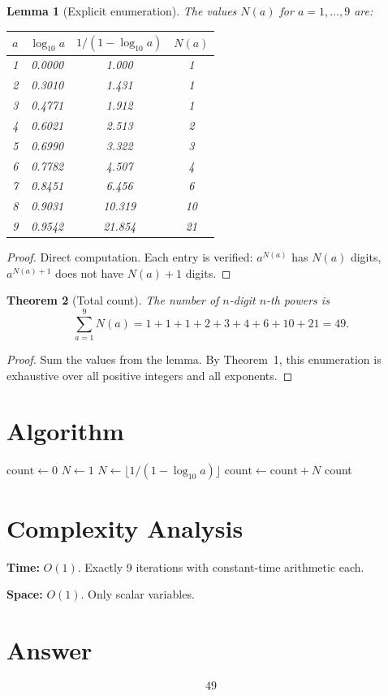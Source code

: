 \documentclass[12pt,a4paper]{article}
\newtheorem{theorem}{Theorem}
\newtheorem{lemma}[theorem]{Lemma}
\begin{document}
\begin{lemma}[Explicit enumeration]
The values $N(a)$ for $a = 1, \ldots, 9$ are:
\begin{center}
\begin{tabular}{cccc}
$a$ & $\log_{10} a$ & $1/(1 - \log_{10} a)$ & $N(a)$ \\
\hline
1 & 0.0000 & 1.000 & 1 \\
2 & 0.3010 & 1.431 & 1 \\
3 & 0.4771 & 1.912 & 1 \\
4 & 0.6021 & 2.513 & 2 \\
5 & 0.6990 & 3.322 & 3 \\
6 & 0.7782 & 4.507 & 4 \\
7 & 0.8451 & 6.456 & 6 \\
8 & 0.9031 & 10.319 & 10 \\
9 & 0.9542 & 21.854 & 21 \\
\end{tabular}
\end{center}
\end{lemma}

\begin{proof}
Direct computation. Each entry is verified: $a^{N(a)}$ has $N(a)$ digits, $a^{N(a)+1}$ does not have $N(a)+1$ digits.
\end{proof}

\begin{theorem}[Total count]
The number of $n$-digit $n$-th powers is
\[
\sum_{a=1}^{9} N(a) = 1 + 1 + 1 + 2 + 3 + 4 + 6 + 10 + 21 = 49.
\]
\end{theorem}

\begin{proof}
Sum the values from the lemma. By Theorem~1, this enumeration is exhaustive over all positive integers and all exponents.
\end{proof}

\section{Algorithm}

\begin{algorithm}[H]
\caption{Count $n$-digit $n$-th powers}
\begin{algorithmic}[1]
\STATE $\mathrm{count} \gets 0$
        \STATE $N \gets 1$
    \ELSE
        \STATE $N \gets \lfloor 1 / (1 - \log_{10} a) \rfloor$
    \ENDIF
    \STATE $\mathrm{count} \gets \mathrm{count} + N$
\ENDFOR
\RETURN count
\end{algorithmic}
\end{algorithm}

\section{Complexity Analysis}

\textbf{Time:} $O(1)$. Exactly 9 iterations with constant-time arithmetic each.

\textbf{Space:} $O(1)$. Only scalar variables.

\section{Answer}

\[
\boxed{49}
\]
\end{document}
